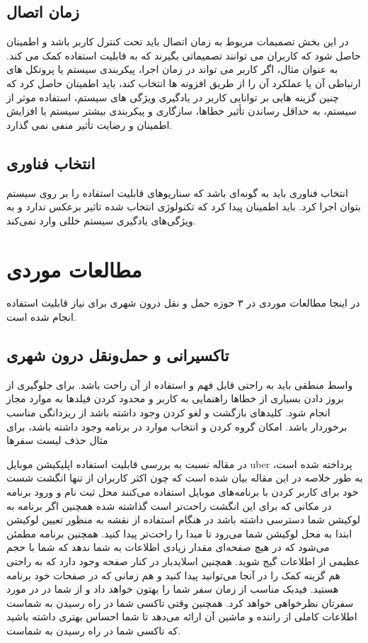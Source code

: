 \subsection{زمان اتصال}
در این بخش تصمیمات مربوط به زمان  اتصال باید تحت کنترل کاربر باشد و اطمینان حاصل شود که کاربران می توانند تصمیماتی بگیرند که به قابلیت استفاده کمک می کند.
به عنوان مثال، اگر کاربر می تواند در زمان اجرا، پیکربندی سیستم یا پروتکل های ارتباطی آن یا عملکرد آن را از طریق افزونه ها انتخاب کند، باید اطمینان حاصل کرد که چنین گزینه هایی بر توانایی کاربر در یادگیری ویژگی های سیستم، استفاده موثر از سیستم، به حداقل رساندن تأثیر خطاها، سازگاری و پیکربندی بیشتر سیستم یا افزایش اطمینان و رضایت 
تأثیر منفی نمی گذارد.
\subsection{انتخاب فناوری}
انتخاب فناوری باید به گونه‌ای باشد که سناریو‌های قابلیت استفاده را بر روی سیستم بتوان اجرا کرد.
باید اطمینان پیدا کرد که تکنولوژی انتخاب شده تاثیر برعکس ندارد و به ویژگی‌های یادگیری سیستم خللی وارد نمی‌کند. 


\section{مطالعات موردی}
در اینجا مطالعات موردی در ۳ حوزه حمل و نقل درون شهری برای نیاز قابلیت استفاده انجام شده است. 
\subsection{تاکسیرانی و حمل‌و‌نقل درون شهری}
واسط منطقی باید به راحتی قابل فهم و استفاده از آن راحت باشد. برای جلوگیری از بروز دادن بسیاری از خطاها  راهنمایی به کاربر و محدود کردن فیلدها به موارد مجاز انجام شود.
کلیدهای بازگشت و لغو کردن وجود داشته باشد از ریزدانگی مناسب برخوردار باشد. امکان گروه کردن و انتخاب موارد در برنامه وجود داشته باشد، برای مثال حذف لیست سفرها

در مقاله \cite{uber_ux} نسبت به بررسی قابلیت استفاده اپلیکیشن موبایل uber پرداخته شده است، به طور خلاصه در این مقاله بیان شده است که چون اکثر کاربران از تنها انگشت شست خود برای کاربر کردن با برنامه‌های موبایل استفاده می‌کنند محل ثبت نام و ورود برنامه در مکانی که برای این انگشت راحت‌تر است گذاشته شده همچنین اگر برنامه به لوکیشن شما دسترسی داشته باشد در هنگام استفاده از نقشه به منظور تعیین لوکیشن ابتدا به محل لوکیشن شما می‌رود تا مبدا را راحت‌تر پیدا کنید. 
همچنین برنامه مطمئن می‌شود که در هیچ صفحه‌ای مقدار زیادی اطلاعات به شما ندهد که شما با حجم عظیمی از اطلاعات گیج شوید. 
همچنین اسلایدبار در کنار صفحه وجود دارد که به راحتی هم گزینه کمک را در آنجا می‌توانید پیدا کنید و  هم زمانی که در صفحات خود برنامه هستید. 
فیدبک مناسب از زمان سفر شما را بهتون خواهد داد و از شما در  در مورد سفرتان نظرخواهی خواهد کرد. 
همچنین وقتی تاکسی شما در راه رسیدن به شماست اطلاعات کاملی از راننده و ماشین آن ارائه می‌دهد تا شما احساس  بهتری داشته باشید که تاکسی شما در راه رسیدن به شماست.

